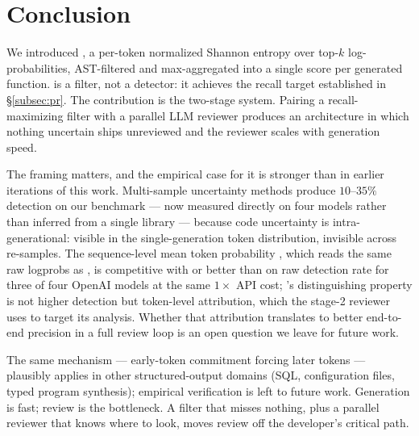 \section{Conclusion}
\label{sec:conclusion}

We introduced \eps, a per-token normalized Shannon entropy over top-$k$
log-probabilities, AST-filtered and max-aggregated into a single score
per generated function. \eps is a filter, not a detector: it achieves
the recall target established in \S\ref{subsec:pr}. The contribution is
the two-stage system. Pairing a recall-maximizing filter with a
parallel LLM reviewer produces an architecture in which nothing
uncertain ships unreviewed and the reviewer scales with generation
speed.

The framing matters, and the empirical case for it is stronger than in
earlier iterations of this work. Multi-sample uncertainty methods
produce $10$--$35\%$ detection on our benchmark --- now measured
directly on four models rather than inferred from a single library ---
because code uncertainty is intra-generational: visible in the
single-generation token distribution, invisible across re-samples. The
sequence-level mean token probability \papg, which reads the same raw
logprobs as \eps, is competitive with or better than \eps on raw
detection rate for three of four OpenAI models at the same $1\times$
API cost; \eps's distinguishing property is not higher detection but
token-level attribution, which the stage-2 reviewer uses to target its
analysis. Whether that attribution translates to better end-to-end
precision in a full review loop is an open question we leave for
future work.

The same mechanism --- early-token commitment forcing later tokens ---
plausibly applies in other structured-output domains (SQL,
configuration files, typed program synthesis); empirical verification
is left to future work. Generation is fast; review is the bottleneck.
A filter that misses nothing, plus a parallel reviewer that knows
where to look, moves review off the developer's critical path.
